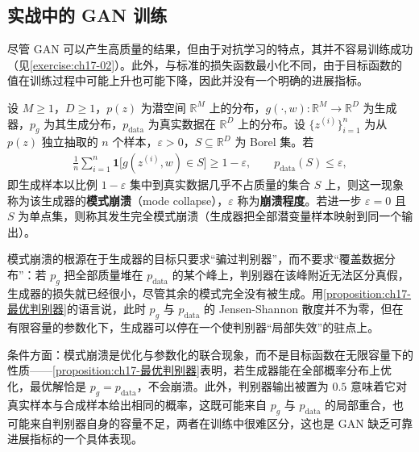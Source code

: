 \documentclass[../../main.tex]{subfiles}
\begin{document}
\subsection{实战中的 GAN 训练}\label{subsection:ch17-实战GAN训练}

尽管 GAN 可以产生高质量的结果，但由于对抗学习的特点，其并不容易训练成功（见\cref{exercise:ch17-02}）。此外，与标准的损失函数最小化不同，由于目标函数的值在训练过程中可能上升也可能下降，因此并没有一个明确的进展指标。

\begin{definition}[模式崩溃]\label{definition:ch17-模式崩溃}
设 $M\geqslant1$，$D\geqslant1$，$p(z)$ 为潜空间 $\mathbb{R}^{M}$ 上的分布，$g(\cdot,w):\mathbb{R}^{M}\to\mathbb{R}^{D}$ 为生成器，$p_g$ 为其生成分布，$p_{\mathrm{data}}$ 为真实数据在 $\mathbb{R}^{D}$ 上的分布。设 $\{z^{(i)}\}_{i=1}^{n}$ 为从 $p(z)$ 独立抽取的 $n$ 个样本，$\varepsilon>0$，$S\subseteq\mathbb{R}^{D}$ 为 Borel 集。若
\begin{align*}
\frac{1}{n}\sum_{i=1}^{n}\mathbf{1}\big[g(z^{(i)},w)\in S\big]\geqslant1-\varepsilon,\qquad p_{\mathrm{data}}(S)\leqslant\varepsilon,
\end{align*}
即生成样本以比例 $1-\varepsilon$ 集中到真实数据几乎不占质量的集合 $S$ 上，则这一现象称为该生成器的\textbf{模式崩溃}（mode collapse），$\varepsilon$ 称为\textbf{崩溃程度}。若进一步 $\varepsilon=0$ 且 $S$ 为单点集，则称其发生完全模式崩溃（生成器把全部潜变量样本映射到同一个输出）。
\end{definition}

\begin{remark}
模式崩溃的根源在于生成器的目标只要求“骗过判别器”，而不要求“覆盖数据分布”：若 $p_g$ 把全部质量堆在 $p_{\mathrm{data}}$ 的某个峰上，判别器在该峰附近无法区分真假，生成器的损失就已经很小，尽管其余的模式完全没有被生成。用\cref{proposition:ch17-最优判别器}的语言说，此时 $p_g$ 与 $p_{\mathrm{data}}$ 的 Jensen-Shannon 散度并不为零，但在有限容量的参数化下，生成器可以停在一个使判别器“局部失效”的驻点上。

条件方面：模式崩溃是优化与参数化的联合现象，而不是目标函数在无限容量下的性质——\cref{proposition:ch17-最优判别器}表明，若生成器能在全部概率分布上优化，最优解恰是 $p_g=p_{\mathrm{data}}$，不会崩溃。此外，判别器输出被置为 $0.5$ 意味着它对真实样本与合成样本给出相同的概率，这既可能来自 $p_g$ 与 $p_{\mathrm{data}}$ 的局部重合，也可能来自判别器自身的容量不足，两者在训练中很难区分，这也是 GAN 缺乏可靠进展指标的一个具体表现。
\end{remark}
\end{document}
